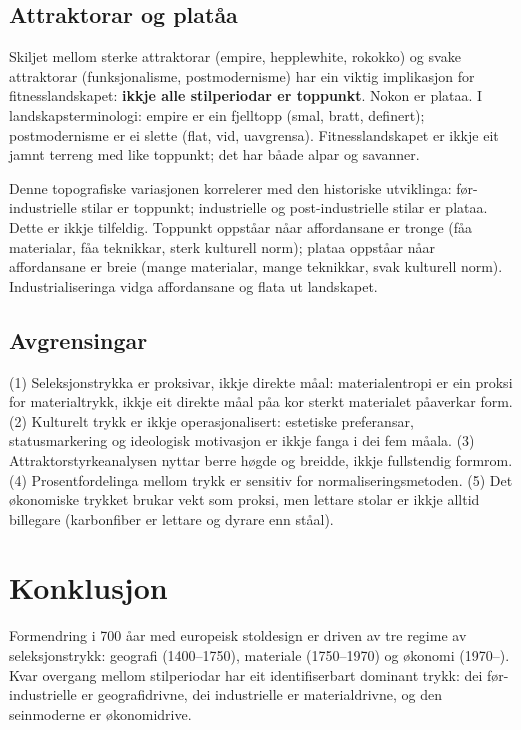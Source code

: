 \documentclass[10pt, a4paper, twocolumn]{article}
\begin{document}
\subsection{Attraktorar og plat\r{a}a}

Skiljet mellom sterke attraktorar (empire, hepplewhite, rokokko) og svake attraktorar (funksjonalisme, postmodernisme) har ein viktig implikasjon for fitnesslandskapet: \textbf{ikkje alle stilperiodar er toppunkt}. Nokon er plataa. I landskapsterminologi: empire er ein fjelltopp (smal, bratt, definert); postmodernisme er ei slette (flat, vid, uavgrensa). Fitnesslandskapet er ikkje eit jamnt terreng med like toppunkt; det har b\r{a}ade alpar og savanner.

Denne topografiske variasjonen korrelerer med den historiske utviklinga: f\o r-industrielle stilar er toppunkt; industrielle og post-industrielle stilar er plataa. Dette er ikkje tilfeldig. Toppunkt oppst\r{a}ar n\r{a}ar affordansane er tronge (f\r{a}a materialar, f\r{a}a teknikkar, sterk kulturell norm); plataa oppst\r{a}ar n\r{a}ar affordansane er breie (mange materialar, mange teknikkar, svak kulturell norm). Industrialiseringa vidga affordansane og flata ut landskapet.

\subsection{Avgrensingar}

(1) Seleksjonstrykka er proksivar, ikkje direkte m\r{a}al: materialentropi er ein proksi for materialtrykk, ikkje eit direkte m\r{a}al p\r{a}a kor sterkt materialet p\r{a}averkar form. (2) Kulturelt trykk er ikkje operasjonalisert: estetiske preferansar, statusmarkering og ideologisk motivasjon er ikkje fanga i dei fem m\r{a}ala. (3) Attraktorstyrkeanalysen nyttar berre h\o gde og breidde, ikkje fullstendig formrom. (4) Prosentfordelinga mellom trykk er sensitiv for normaliseringsmetoden. (5) Det \o konomiske trykket brukar vekt som proksi, men lettare stolar er ikkje alltid billegare (karbonfiber er lettare og dyrare enn st\r{a}al).


\section{Konklusjon}

Formendring i 700 \r{a}ar med europeisk stoldesign er driven av tre regime av seleksjonstrykk: geografi (1400--1750), materiale (1750--1970) og \o konomi (1970--). Kvar overgang mellom stilperiodar har eit identifiserbart dominant trykk: dei f\o r-industrielle er geografidrivne, dei industrielle er materialdrivne, og den seinmoderne er \o konomidrive.
\end{document}
